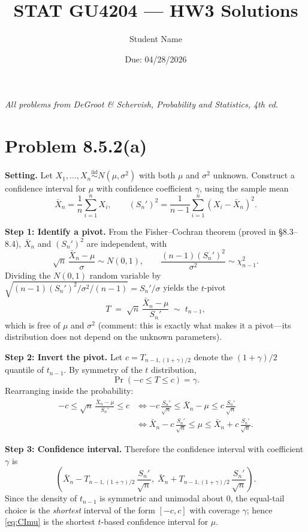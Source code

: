 \documentclass[11pt]{article}
\title{STAT GU4204 --- HW3 Solutions}
\author{Student Name}
\date{Due: 04/28/2026}
\newcommand{\iid}{\stackrel{\text{iid}}{\sim}}
\begin{document}
\maketitle

\noindent \textit{All problems from DeGroot \& Schervish, \emph{Probability and Statistics}, 4th ed.}

\bigskip
\section*{Problem 8.5.2(a)}
\textbf{Setting.} Let $X_1,\dots,X_n \iid N(\mu,\sigma^2)$ with both $\mu$ and $\sigma^2$ unknown. Construct a confidence interval for $\mu$ with confidence coefficient $\gamma$, using the sample mean
\[
\bar X_n = \frac{1}{n}\sum_{i=1}^n X_i, \qquad
(S_n')^2 = \frac{1}{n-1}\sum_{i=1}^n (X_i-\bar X_n)^2.
\]

\textbf{Step 1: Identify a pivot.} From the Fisher--Cochran theorem (proved in \S 8.3--8.4), $\bar X_n$ and $(S_n')^2$ are independent, with
\[
\sqrt{n}\,\frac{\bar X_n-\mu}{\sigma}\sim N(0,1), \qquad \frac{(n-1)(S_n')^2}{\sigma^2}\sim \chi^2_{n-1}.
\]
Dividing the $N(0,1)$ random variable by $\sqrt{(n-1)(S_n')^2/\sigma^2/(n-1)}=S_n'/\sigma$ yields the $t$-pivot
\begin{equation}\label{eq:tpivot}
T \;=\; \sqrt{n}\,\frac{\bar X_n-\mu}{S_n'} \;\sim\; t_{n-1},
\end{equation}
which is free of $\mu$ and $\sigma^2$ (comment: this is exactly what makes it a pivot---its distribution does not depend on the unknown parameters).

\textbf{Step 2: Invert the pivot.} Let $c = T_{n-1,(1+\gamma)/2}$ denote the $(1+\gamma)/2$ quantile of $t_{n-1}$. By symmetry of the $t$ distribution,
\[
\Pr(-c \le T \le c) = \gamma.
\]
Rearranging inside the probability:
\begin{align*}
-c \le \sqrt{n}\,\frac{\bar X_n-\mu}{S_n'} \le c
&\iff -c\,\frac{S_n'}{\sqrt{n}} \le \bar X_n-\mu \le c\,\frac{S_n'}{\sqrt{n}} \\
&\iff \bar X_n - c\,\frac{S_n'}{\sqrt{n}} \le \mu \le \bar X_n + c\,\frac{S_n'}{\sqrt{n}}.
\end{align*}

\textbf{Step 3: Confidence interval.} Therefore the confidence interval with coefficient $\gamma$ is
\begin{equation}\label{eq:CImu}
\boxed{\;\; \left(\bar X_n - T_{n-1,(1+\gamma)/2}\,\frac{S_n'}{\sqrt{n}},\; \bar X_n + T_{n-1,(1+\gamma)/2}\,\frac{S_n'}{\sqrt{n}}\right).\;\;}
\end{equation}
Since the density of $t_{n-1}$ is symmetric and unimodal about $0$, the equal-tail choice is the \emph{shortest} interval of the form $[-c,c]$ with coverage $\gamma$; hence \eqref{eq:CImu} is the shortest $t$-based confidence interval for $\mu$.
\end{document}
